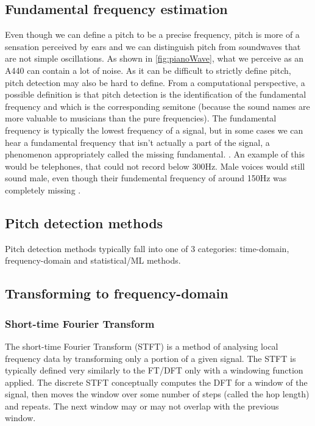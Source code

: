 \subsection{Fundamental frequency estimation}
Even though we can define a pitch to be a precise frequency, pitch is more of a sensation perceived by ears and we can distinguish pitch from soundwaves that are not simple oscillations. As shown in \ref{fig:pianoWave}, what we perceive as an A440 can contain a lot of noise.  As it can be difficult to strictly define pitch, pitch detection may also be hard to define. From a computational perspective, a possible definition is that pitch detection is the identification of the fundamental frequency and which is the corresponding semitone (because the sound names are more valuable to musicians than the pure frequencies). The fundamental frequency is typically the lowest frequency of a signal, but in some cases we can hear a fundamental frequency that isn't actually a part of the signal, a phenomenon appropriately called the missing fundamental. . An example of this would be telephones, that could not record below 300Hz. Male voices would still sound male, even though their fundemental frequency of around 150Hz was completely missing . 

\subsection{Pitch detection methods}
Pitch detection methods typically fall into one of 3 categories: time-domain, frequency-domain and statistical/ML methods.

\subsection {Transforming to frequency-domain}
\subsubsection{Short-time Fourier Transform}
The short-time Fourier Transform (STFT) is a method of analysing local frequency data by transforming only a portion of a given signal. The STFT is typically defined very similarly to the FT/DFT only with a windowing function applied. The discrete STFT conceptually computes the DFT for a window of the signal, then moves the window over some number of steps (called the hop length) and repeats. The next window may or may not overlap with the previous window.

